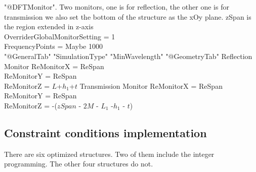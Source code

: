 \documentclass[12pt]{article}
\numberwithin{equation}{section}
\numberwithin{equation}{section}
\begin{document}
\begin{outline}[enumerate]
	   
       \2 "@DFTMonitor".  Two monitors, one is for reflection, the other one is for transmission we also set the 		            bottom of the structure as the xOy plane. zSpan is the region extended in z-axis\\
       		OverriderGlobalMonitorSetting = 1 \\
		FrequencyPoints = Maybe 1000 \\
         \3 "@GeneralTab"
         	\4 "SimulationType" 
         	\4 "MinWavelength" 
	 	\4 
         \3 "@GeometryTab"
         \3 Reflection Monitor
		ReMonitorX = ReSpan \\
		ReMonitorY = ReSpan \\
		ReMonitorZ = $L$+$h_1$+$t$
	\3 Transmission Monitor
 		ReMonitorX = ReSpan \\
		ReMonitorY = ReSpan \\
		ReMonitorZ = -($zSpan$ - $2M$ - $L_{1}$ -$h_{1}$ - $t$)

\end{outline}




\subsection{Constraint conditions implementation}
There are six optimized structures. Two of them include the integer programming. The other four structures do not. 

\end{document}
